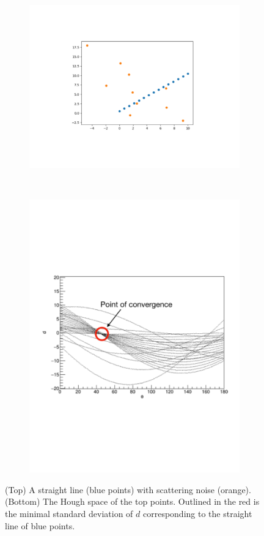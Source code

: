 \documentclass[final,number,sort&compress,5p,times,twocolumn]{elsarticle}
\begin{document}
\begin{figure}[hbt!]
	\centering
	\begin{subfigure}{.5\textwidth}
  		\centering
  		\includegraphics[width=\linewidth]{figures/HoughExample1}
	\end{subfigure}%
	\\
	\begin{subfigure}{.5\textwidth}
  		\centering
  		\includegraphics[width=\linewidth]{figures/HoughExample2}
	\end{subfigure}
	\caption{(Top) A straight line (blue points) with scattering noise (orange). (Bottom) The Hough space of the top points. Outlined in the red is the minimal standard deviation of $d$ corresponding to the straight line of blue points.}
	\label{fig:HoughExample}
\end{figure}
\end{document}
